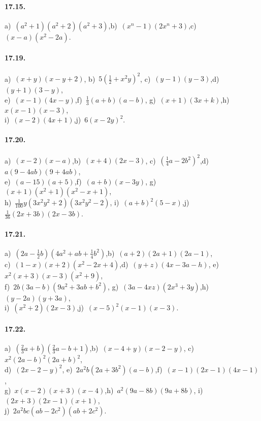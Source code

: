 \paragraph{17.15.} a)~$(a^{2}+1)(a^{2}+2)(a^{2}+3)$,\quad b)~$(x^{n}-1)(2x^{n}+3)$,\quad c)~$(x-a)\left(x^{2}-2a\right)$.

\paragraph{17.19.} a)~$(x+y)\left(x-y+2\right)$,\quad
b)~$5\left(\frac{1}{2}+x^{2}y\right)^{2}$,\quad
c)~$(y-1)\left(y-3\right)$,\quad d)~$(y+1)\left(3-y\right)$,\protect\\
e)~$(x-1)\left(4x-y\right)$,\quad f)~$\frac{1}{3}(a+b)\left(a-b\right)$,\quad
g)~$(x+1)\left(3x+k\right)$,\quad h)~$x(x-1)\left(x-3\right)$,\protect\\
i)~$(x-2)\left(4x+1\right)$,\quad j)~$6\left(x-2y\right)^{2}$.

\paragraph{17.20.} a)~$(x-2)\left(x-a\right)$,\quad b)~$(x+4)\left(2x-3\right)$,\quad
c)~$\left(\frac{1}{4}a-2b^{2}\right)^{2}$,\quad d)~$a(9-4{ab})(9+4{ab})$,\quad \protect\\
e)~$(a-15)(a+5)$,\quad f)~$(a+b)(x-3y)$,\quad
g)~$(x+1)\left(x^{2}+1\right)\left(x^{2}-x+1\right)$,\protect\\
h)~$\frac{1}{100}y\left(3x^{2}y^{2}+2\right)\left(3x^{2}y^{2}-2\right)$,\quad
i)~$(a+b)^{2}\left(5-x\right)$,\quad j)~$\frac{1}{36}(2x+3b)\left(2x-3b\right)$.

\paragraph{17.21.} a)~$\left(2a-\frac{1}{2}b\right)\left(4a^{2}+{ab}+\frac{1}{4}b^{2}\right)$,\quad b)~$(a+2)\left(2a+1\right)\left(2a-1\right)$,\quad \protect\\
c)~$(1-x)\left(x+2\right)\left(x^{2}-2x+4\right)$,\quad d)~$(y+z)(4x-3a-h)$,\quad
e)~$x^{2}(x+3)(x-3)\left(x^{2}+9\right)$,\protect\\
f)~$2b(3a-b)\left(9a^{2}+3{ab}+b^{2}\right)$,\quad
g)~$(3a-4{xz})\left(2x^{3}+3y\right)$,\quad h)~$(y-2a)\left(y+3a\right)$,\quad \protect\\
i)~$\left(x^{2}+2\right)(2x-3)$,\quad j)~$(x-5)^{2}(x-1)(x-3)$.

\paragraph{17.22.} a)~$\left(\frac{2}{3}a+b\right)\left(\frac{2}{3}a-b+1\right)$,\quad b)~$(x-4+y)(x-2-y)$,\quad
c)~$x^{2}(2a-b)^{2}(2a+b)^{2}$,\protect\\
d)~$(2x-2-y)^{2}$,\quad
e)~$2a^{2}b(2a+3b^{2})(a-b)$,\quad f)~$(x-1)(2x-1)(4x-1)$,\quad \protect\\
g)~$x(x-2)(x+3)(x-4)$,\quad h)~$a^{2}(9a-8b)(9a+8b)$,\quad
i)~$(2x+3)(2x-1)(x+1)$,\protect\\
j)~$2a^{2}{bc}({ab}-2c^{2})({ab}+2c^{2})$.

